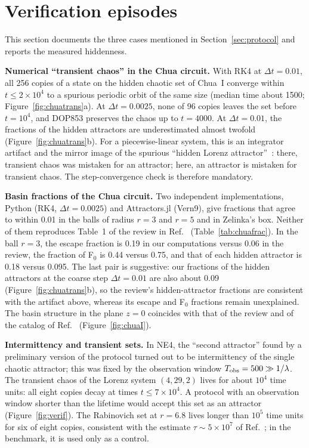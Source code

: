 \section{Verification episodes}\label{app:verification}

This section documents the three cases mentioned in Section~\ref{sec:protocol} and reports the measured hiddenness.

\textbf{Numerical ``transient chaos'' in the Chua circuit.} With RK4 at $\Delta t=0.01$, all 256 copies of a state on the hidden chaotic set of Chua~I converge within $t\le2\times10^4$ to a spurious periodic orbit of the same size (median time about 1500; Figure~\ref{fig:chuatrans}a). At $\Delta t=0.0025$, none of 96 copies leaves the set before $t=10^4$, and DOP853 preserves the chaos up to $t=4000$. At $\Delta t=0.01$, the fractions of the hidden attractors are underestimated almost twofold (Figure~\ref{fig:chuatrans}b). For a piecewise-linear system, this is an integrator artifact and the mirror image of the spurious ``hidden Lorenz attractor''~\cite{Munmuangsaen2018,SprottMunmuangsaen2018Comment}: there, transient chaos was mistaken for an attractor; here, an attractor is mistaken for transient chaos. The step-convergence check is therefore mandatory.

\textbf{Basin fractions of the Chua circuit.} Two independent implementations, Python (RK4, $\Delta t=0.0025$) and Attractors.jl (Vern9), give fractions that agree to within 0.01 in the balls of radius $r=3$ and $r=5$ and in Zelinka's box. Neither of them reproduces Table~1 of the review in Ref.~\cite{GuanXie2025} (Table~\ref{tab:chuafrac}). In the ball $r=3$, the escape fraction is 0.19 in our computations versus 0.06 in the review, the fraction of F$_0$ is 0.44 versus 0.75, and that of each hidden attractor is 0.18 versus 0.095. The last pair is suggestive: our fractions of the hidden attractors at the coarse step $\Delta t=0.01$ are also about 0.09 (Figure~\ref{fig:chuatrans}b), so the review's hidden-attractor fractions are consistent with the artifact above, whereas its escape and F$_0$ fractions remain unexplained. The basin structure in the plane $z=0$ coincides with that of the review and of the catalog of Ref.~\cite{Wagemakers2025Zoo} (Figure~\ref{fig:chuaI}).

\textbf{Intermittency and transient sets.} In NE4, the ``second attractor'' found by a preliminary version of the protocol turned out to be intermittency of the single chaotic attractor; this was fixed by the observation window $T_{\rm obs}=500\gg1/\lambda$. The transient chaos of the Lorenz system $(4,29,2)$ lives for about $10^4$ time units: all eight copies decay at times $t\le7\times10^4$. A protocol with an observation window shorter than the lifetime would accept this set as an attractor (Figure~\ref{fig:verif}). The Rabinovich set at $r=6.8$ lives longer than $10^5$ time units for six of eight copies, consistent with the estimate $\tau\sim5\times10^7$ of Ref.~\cite{SprottMunmuangsaen2018Comment}; in the benchmark, it is used only as a control.

